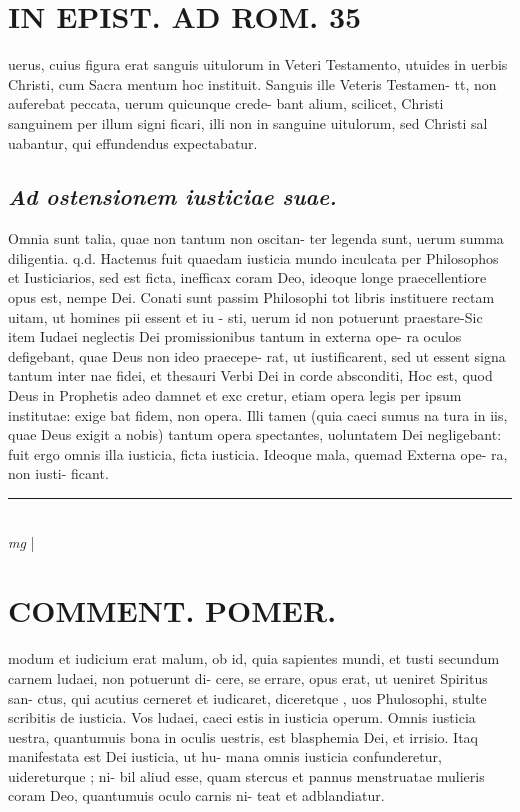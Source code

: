 \documentclass{article}
\begin{document}
\begin{pages}
\section*{IN EPIST. AD ROM. 35 }
\marginpar{[ p.]}\pstart uerus, cuius figura erat sanguis uitulorum in Veteri Testamento, utuides in uerbis Christi, cum Sacra mentum hoc instituit. Sanguis ille Veteris Testamen- tt, non auferebat peccata, uerum quicunque crede- bant alium, scilicet, Christi sanguinem per illum signi ficari, illi non in sanguine uitulorum, sed Christi sal uabantur, qui effundendus expectabatur.  \pend
{}
{}
\subsection*{\textit{Ad ostensionem iusticiae suae. }}\pstart Omnia sunt talia, quae non tantum non oscitan- ter legenda sunt, uerum summa diligentia. q.d.  Hactenus fuit quaedam iusticia mundo inculcata per Philosophos et Iusticiarios, sed est ficta, inefficax coram Deo, ideoque longe praecellentiore opus est, nempe Dei. Conati sunt passim Philosophi tot libris instituere rectam uitam, ut homines pii essent et iu - sti, uerum id non potuerunt praestare-Sic item Iudaei neglectis Dei promissionibus tantum in externa ope- ra oculos defigebant, quae Deus non ideo praecepe- rat, ut iustificarent, sed ut essent signa tantum inter nae fidei, et thesauri Verbi Dei in corde absconditi, Hoc est, quod Deus in Prophetis adeo damnet et exc cretur, etiam opera legis per ipsum institutae: exige bat fidem, non opera. Illi tamen (quia caeci sumus na tura in iis, quae Deus exigit a nobis) tantum opera spectantes, uoluntatem Dei negligebant: fuit ergo omnis illa iusticia, ficta iusticia. Ideoque mala, quemad Externa ope- ra, non iusti- ficant.  \pend
\vspace{0.5cm}\noindent
\vspace{0.2cm}\rule{1cm}{0.2pt}\\ 
\hspace{0.2cm}\textit{mg}
\footnotesize 
\normalsize| 
\section*{COMMENT. POMER.  }\pstart modum et iudicium erat malum, ob id, quia sapientes mundi, et tusti secundum carnem ludaei, non potuerunt di- cere, se errare, opus erat, ut ueniret Spiritus san- ctus, qui acutius cerneret et iudicaret, diceretque , uos Phulosophi, stulte scribitis de iusticia. Vos ludaei, caeci estis in iusticia operum. Omnis iusticia uestra, quantumuis bona in oculis uestris, est blasphemia Dei, et irrisio. Itaq manifestata est Dei iusticia, ut hu- mana omnis iusticia confunderetur, uidereturque ; ni- bil aliud esse, quam stercus et pannus menstruatae mulieris coram Deo, quantumuis oculo carnis ni- teat et adblandiatur.  \pend
{}
{}

\end{pages}
\end{document}
